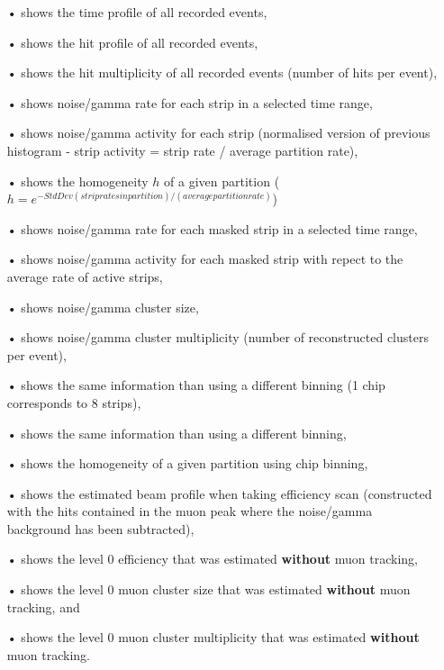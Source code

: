 	\begin{itemize}
		\item[•]  shows the time profile of all recorded events,
		\item[•]  shows the hit profile of all recorded events,
		\item[•]  shows the hit multiplicity of all recorded events (number of hits per event),
		\item[•]  shows noise/gamma rate for each strip in a selected time range,
		\item[•]  shows noise/gamma activity for each strip (normalised version of previous histogram - strip activity = strip rate / average partition rate),
		\item[•]  shows the homogeneity $h$ of a given partition ($h = e^{-StdDev(strip rates in partition)/(average partition rate)}$)
		\item[•]  shows noise/gamma rate for each masked strip in a selected time range,
		\item[•]  shows noise/gamma activity for each masked strip with repect to the average rate of active strips,
		\item[•]  shows noise/gamma cluster size,
		\item[•]  shows noise/gamma cluster multiplicity (number of reconstructed clusters per event),
		\item[•]  shows the same information than  using a different binning (1 chip corresponds to 8 strips),
		\item[•]  shows the same information than  using a different binning,
		\item[•]  shows the homogeneity of a given partition using chip binning,
		\item[•]  shows the estimated beam profile when taking efficiency scan (constructed with the hits contained in the muon peak where the noise/gamma background has been subtracted),
		\item[•]  shows the level 0 efficiency that was estimated \textbf{without} muon tracking,
		\item[•]  shows the level 0 muon cluster size that was estimated \textbf{without} muon tracking, and
		\item[•]  shows the level 0 muon cluster multiplicity that was estimated \textbf{without} muon tracking.
	\end{itemize}

